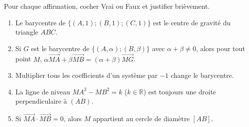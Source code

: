 \documentclass[11pt]{article}
\begin{document}
\begin{exercice}
Pour chaque affirmation, cocher Vrai ou Faux et justifier brièvement.
\begin{enumerate}
    \item Le barycentre de $\{(A,1);(B,1);(C,1)\}$ est le centre de gravité du triangle $ABC$.
    \item Si $G$ est le barycentre de $\{(A,\alpha);(B,\beta)\}$ avec $\alpha+\beta \neq 0$, alors pour tout point $M$, $\alpha\overrightarrow{MA}+\beta\overrightarrow{MB}=(\alpha+\beta)\overrightarrow{MG}$.
    \item Multiplier tous les coefficients d'un système par $-1$ change le barycentre.
    \item La ligne de niveau $MA^2 - MB^2 = k$ ($k \in \mathbb{R}$) est toujours une droite perpendiculaire à $(AB)$.
    \item Si $\overrightarrow{MA} \cdot \overrightarrow{MB} = 0$, alors $M$ appartient au cercle de diamètre $[AB]$.
\end{enumerate}
\end{exercice}
\end{document}

